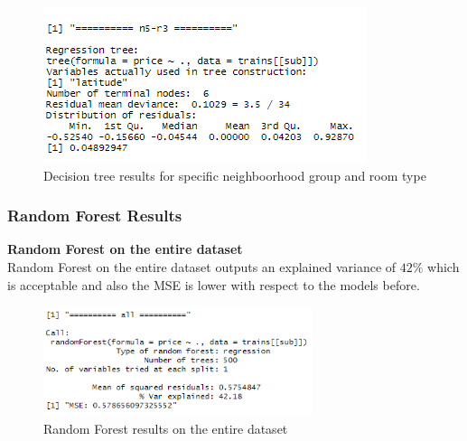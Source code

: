 \documentclass{FR16}
\begin{document}
\begin{figure}[!htb]
   
    \begin{minipage}{0.48\textwidth}
     \centering
     \includegraphics[width=.7\linewidth]{figures/dt4.2.PNG}
   \end{minipage}
        \caption{ Decision tree results for specific neighboorhood group and room type}\label{fig:12}

\end{figure}

\newpage
\subsubsection{Random Forest Results}
\textbf{Random Forest  on the entire dataset}\\
Random Forest on the entire dataset outputs an explained variance of $42\%$ which is acceptable and also the MSE is lower with respect to the models before. 
\begin{figure}[h]
\centering
\includegraphics[width=0.7\textwidth]{figures/rf.PNG} 
 \caption{\label{fig:13} Random Forest results on the entire dataset}
\end{figure}
\end{document}
